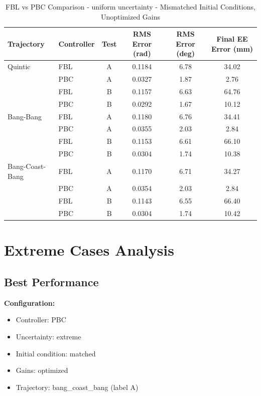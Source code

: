 \documentclass[11pt,a4paper]{article}
\begin{document}
\begin{table}[H]
\centering
\caption{FBL vs PBC Comparison - uniform uncertainty - Mismatched Initial Conditions, Unoptimized Gains}
\begin{tabular}{llcccc}
\toprule
Trajectory & Controller & Test & RMS Error (rad) & RMS Error (deg) & Final EE Error (mm) \\
\midrule
Quintic & FBL & A & 0.1184 & 6.78 & 34.02 \\
 & PBC & A & \textcolor{bestcolor}{0.0327} & \textcolor{bestcolor}{1.87} & \textcolor{bestcolor}{2.76} \\
 & FBL & B & 0.1157 & 6.63 & 64.76 \\
 & PBC & B & \textcolor{bestcolor}{0.0292} & \textcolor{bestcolor}{1.67} & \textcolor{bestcolor}{10.12} \\
\midrule
Bang-Bang & FBL & A & 0.1180 & 6.76 & 34.41 \\
 & PBC & A & \textcolor{bestcolor}{0.0355} & \textcolor{bestcolor}{2.03} & \textcolor{bestcolor}{2.84} \\
 & FBL & B & 0.1153 & 6.61 & 66.10 \\
 & PBC & B & \textcolor{bestcolor}{0.0304} & \textcolor{bestcolor}{1.74} & \textcolor{bestcolor}{10.38} \\
\midrule
Bang-Coast-Bang & FBL & A & 0.1170 & 6.71 & 34.27 \\
 & PBC & A & \textcolor{bestcolor}{0.0354} & \textcolor{bestcolor}{2.03} & \textcolor{bestcolor}{2.84} \\
 & FBL & B & 0.1143 & 6.55 & 66.40 \\
 & PBC & B & \textcolor{bestcolor}{0.0304} & \textcolor{bestcolor}{1.74} & \textcolor{bestcolor}{10.42} \\
\bottomrule
\end{tabular}
\end{table}

\section{Extreme Cases Analysis}

\subsection{Best Performance}

\textbf{Configuration:}
\begin{itemize}
  \item Controller: PBC
  \item Uncertainty: extreme
  \item Initial condition: matched
  \item Gains: optimized
  \item Trajectory: bang\_coast\_bang (label A)
\end{itemize}
\end{document}

